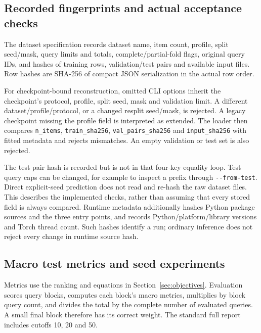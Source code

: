 \documentclass[11pt,a4paper]{article}
\newcommand{\code}[1]{\nolinkurl{#1}}
\numberwithin{equation}{section}
\begin{document}
\subsection{Recorded fingerprints and actual acceptance checks}
The dataset specification records dataset name, item count, profile, split seed/mask,
query limits and totals, complete/partial-fold flags, original query IDs, and hashes of
training rows, validation/test pairs and available input files. Row hashes are SHA-256 of
compact JSON serialization in the actual row order.

For checkpoint-bound reconstruction, omitted CLI options inherit the checkpoint's protocol,
profile, split seed, mask and validation limit. A different dataset/profile/protocol, or a
changed resplit seed/mask, is rejected. A legacy checkpoint missing the profile field is
interpreted as extended. The loader then compares \code{n_items},
\code{train_sha256}, \code{val_pairs_sha256} and \code{input_sha256} with fitted
metadata and rejects mismatches. An empty validation or test set is also rejected.

The test pair hash is recorded but is not in that four-key equality loop. Test query caps
can be changed, for example to inspect a prefix through \code{--from-test}. Direct
explicit-seed prediction does not read and re-hash the raw dataset files. This describes
the implemented checks, rather than assuming that every stored field is always compared.
Runtime metadata additionally hashes Python package sources and the three entry points,
and records Python/platform/library versions and Torch thread count. Such hashes identify
a run; ordinary inference does not reject every change in runtime source hash.

\subsection{Macro test metrics and seed experiments}
Metrics use the ranking and equations in Section~\ref{sec:objectives}. Evaluation scores
query blocks, computes each block's macro metrics, multiplies by block query count, and
divides the total by the complete number of evaluated queries. A small final block
therefore has its correct weight. The standard full report includes cutoffs 10, 20 and 50.
\end{document}
